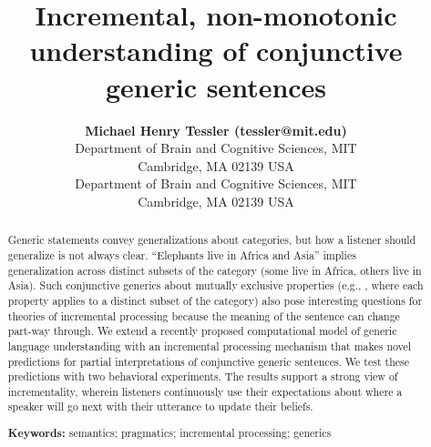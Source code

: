 \documentclass[10pt,letterpaper]{article}
\title{Incremental, non-monotonic understanding of conjunctive generic sentences}
\author{{\large \bf Michael Henry Tessler (tessler@mit.edu)} \\
  Department of Brain and Cognitive Sciences, MIT \\
  Cambridge, MA 02139 USA
  \AND {\large \bf Roger Levy (rplevy@mit.edu)} \\
  Department of Brain and Cognitive Sciences, MIT \\
  Cambridge, MA 02139 USA}
\begin{document}
\maketitle


\begin{abstract}


Generic statements convey generalizations about categories, but  how a listener should generalize is not always clear.  
``Elephants live in Africa and Asia'' implies generalization across distinct subsets of the category (some live in Africa, others live in Asia).
Such conjunctive generics about mutually exclusive properties (e.g., , where each property applies to a distinct subset of the category) also pose interesting questions for theories of incremental processing because the meaning of the sentence can change part-way through. 
We extend a recently proposed computational model of generic language understanding with an incremental processing mechanism that makes novel predictions for partial interpretations of conjunctive generic sentences.
We test these predictions with two behavioral experiments. The results support a strong view of incrementality, wherein listeners  continuously use their expectations about where a speaker will go next with their utterance to update their beliefs.



\textbf{Keywords:} 
semantics; pragmatics; incremental processing; generics
\end{abstract}
\end{document}
